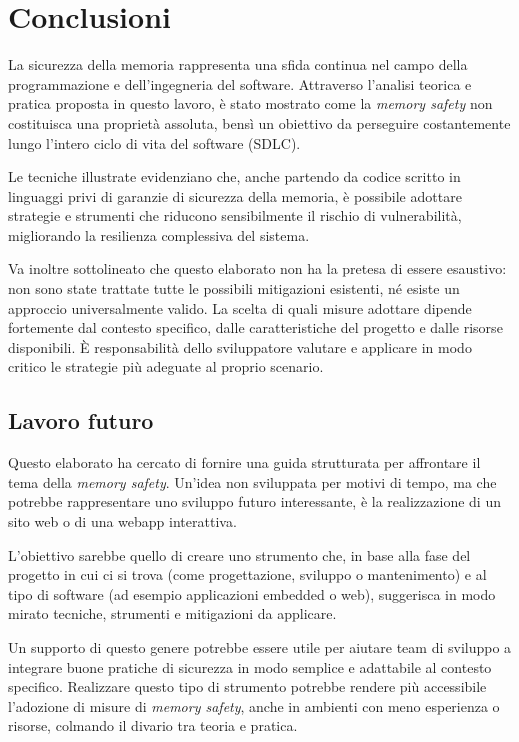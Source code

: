 \chapter{Conclusioni}
\label{cha:conclusioni}

La sicurezza della memoria rappresenta una sfida continua nel campo della
programmazione e dell'ingegneria del software. Attraverso l'analisi teorica e pratica
proposta in questo lavoro, è stato mostrato come la \textit{memory safety} non costituisca
una proprietà assoluta, bensì un obiettivo da perseguire costantemente lungo l'intero
ciclo di vita del software (SDLC).

Le tecniche illustrate evidenziano che, anche partendo da codice scritto in linguaggi
privi di garanzie di sicurezza della memoria, è possibile adottare strategie e
strumenti che riducono sensibilmente il rischio di vulnerabilità, migliorando la
resilienza complessiva del sistema.

Va inoltre sottolineato che questo elaborato non ha la pretesa di essere esaustivo:
non sono state trattate tutte le possibili mitigazioni esistenti, né esiste un approccio
universalmente valido. La scelta di quali misure adottare dipende fortemente dal
contesto specifico, dalle caratteristiche del progetto e dalle risorse disponibili.
È responsabilità dello sviluppatore valutare e applicare in modo critico le
strategie più adeguate al proprio scenario.

\section{Lavoro futuro}
\label{sec:lavoro_futuro}

Questo elaborato ha cercato di fornire una guida strutturata per affrontare il tema
della \textit{memory safety}. Un'idea non sviluppata per motivi di tempo, ma che
potrebbe rappresentare uno sviluppo futuro interessante, è la realizzazione di un
sito web o di una webapp interattiva.

L'obiettivo sarebbe quello di creare uno strumento che, in base alla fase del
progetto in cui ci si trova (come progettazione, sviluppo o mantenimento) e al tipo di software
(ad esempio applicazioni embedded o web), suggerisca in modo mirato tecniche, strumenti
e mitigazioni da applicare.

Un supporto di questo genere potrebbe essere utile per aiutare team di sviluppo a
integrare buone pratiche di sicurezza in modo semplice e adattabile al contesto specifico.
Realizzare questo tipo di strumento potrebbe rendere più accessibile l'adozione
di misure di \textit{memory safety}, anche in ambienti con meno esperienza o
risorse, colmando il divario tra teoria e pratica.

